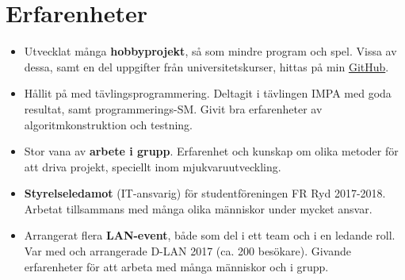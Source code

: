\documentclass[12pt]{article}
\newcommand{\text}[2]{#2}
\newcommand{\text}[2]{#1}
\begin{document}
\section*{\text{Experiences}{Erfarenheter}}
\begin{itemize}
    \item \text{
            Developed multiple \textbf{hobby projects} such as smaller programs and video games. Some of these, as well as some university assignments, can be found on my \href{http://github.com/joelnir}{GitHub}.
        }{
            Utvecklat många \textbf{hobbyprojekt}, så som mindre program och spel. Vissa av dessa, samt en del uppgifter från universitetskurser, hittas på min \href{http://github.com/joelnir}{GitHub}.
        }

    \item \text{
            Experience with \textbf{competitive programming}. I have competed in the IMPA competition with good results and also taken part in the Nordic Collegiate Programming Contest. This has given me good training in algorithm construction and testing.
        }{
            Hållit på med tävlingsprogrammering. Deltagit i tävlingen IMPA med goda resultat, samt programmerings-SM. Givit bra erfarenheter av algoritmkonstruktion och testning.
        }

    \item \text{
            Plenty of experience \textbf{working in groups}. Good team player with experience and knowledge of different methodologies for software development.
        }{
            Stor vana av \textbf{arbete i grupp}. Erfarenhet och kunskap om olika metoder för att driva projekt, speciellt inom mjukvaruutveckling.
        }

    \item \text{
            \textbf{Board member} (IT Manager) of student association FR Ryd 2017-2018. Working with many different people and under a lot of responsibility.
        }{
            \textbf{Styrelseledamot} (IT-ansvarig) för studentföreningen FR Ryd 2017-2018. Arbetat tillsammans med många olika människor under mycket ansvar.
        }

    \item \text{
            Organized multiple \textbf{LAN-parties}, both as a member of a team and in a leading role. Part of the organizing team for D-LAN 2017 (around 200 visitors). Resulted in improved people skills and teamwork.
        }{
            Arrangerat flera \textbf{LAN-event}, både som del i ett team och i en ledande roll. Var med och arrangerade D-LAN 2017 (ca. 200 besökare). Givande erfarenheter för att arbeta med många människor och i grupp.
        }

\end{itemize}
\end{document}

